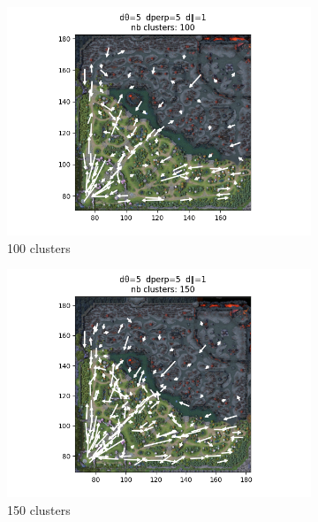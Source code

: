 \begin{figure}[h!]
     \centering
     \begin{subfigure}[b]{0.35\textwidth}
         \centering
         \includegraphics[width=\textwidth]{Images/kmeans/kmeans_100.png}
         \caption{100 clusters}
         \label{fig:kmean_100}
     \end{subfigure}
     \begin{subfigure}[b]{0.35\textwidth}
         \centering
         \includegraphics[width=\textwidth]{Images/kmeans/kmeans_150.png}
         \caption{150 clusters}
         \label{fig:kmeans_150}
     \end{subfigure}
     \begin{subfigure}[b]{0.35\textwidth}

\end{subfigure}
\end{figure}
